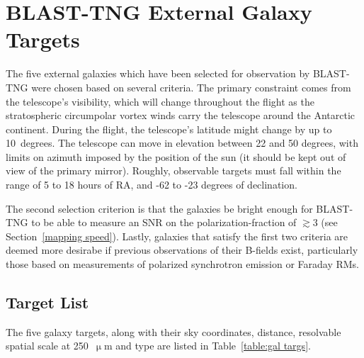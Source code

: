\section{BLAST-TNG External Galaxy Targets}\label{target selection}

The five external galaxies which have been selected for observation by BLAST-TNG were chosen based on several criteria. The primary constraint comes from the telescope's visibility, which will change throughout the flight as the stratospheric circumpolar vortex winds carry the telescope around the Antarctic continent. During the flight, the telescope's latitude might change by up to 10~degrees. The telescope can move in elevation between 22 and 50 degrees, with limits on azimuth imposed by the position of the sun (it should be kept out of view of the primary mirror). Roughly, observable targets must fall within the range of 5 to 18 hours of RA, and -62 to -23 degrees of declination.

The second selection criterion is that the galaxies be bright enough for BLAST-TNG to be able to measure an SNR on the polarization-fraction of $\gtrsim$3 (see Section~\ref{mapping speed}). Lastly, galaxies that satisfy the first two criteria are deemed more desirabe if previous observations of their B-fields exist, particularly those based on measurements of polarized synchrotron emission or Faraday RMs.

\subsection{Target List}\label{targ list}

The five galaxy targets, along with their sky coordinates, distance, resolvable spatial scale at 250~$\upmu$m and type are listed in Table~\ref{table:gal targs}.

